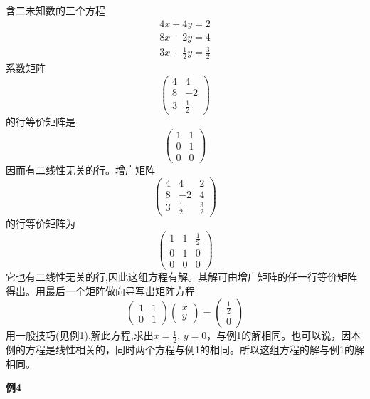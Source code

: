 含二未知数的三个方程
\[
\begin{array}{c}
    4x+4y=2 \\ 8x-2y=4 \\ 3x+\frac{1}{2}y=\frac{3}{2}
\end{array}
\]
系数矩阵
\[
\begin{pmatrix}
    4 & 4 \\
    8 & -2 \\
    3 & \frac{1}{2}
\end{pmatrix}    
\]
的行等价矩阵是
\[
\begin{pmatrix}
    1 & 1 \\
    0 & 1 \\
    0 & 0
\end{pmatrix}    
\]
因而有二线性无关的行。增广矩阵
\[
\begin{pmatrix}
    4 & 4 & 2 \\
    8 & -2 & 4 \\
    3 & \frac{1}{2} & \frac{3}{2}
\end{pmatrix}    
\]
的行等价矩阵为
\[
\begin{pmatrix}
    1 & 1 & \frac{1}{2} \\
    0 & 1 & 0 \\
    0 & 0 & 0
\end{pmatrix}    
\]
它也有二线性无关的行,因此这组方程有解。其解可由增广矩阵的任一行等价矩阵得出。用最后一个矩阵做向导写出矩阵方程
\[
\begin{pmatrix}
    1 & 1 \\
    0 & 1
\end{pmatrix}   
\begin{pmatrix}
    x \\ y
\end{pmatrix}  
=
\begin{pmatrix}
    \frac{1}{2} \\ 0
\end{pmatrix} 
\]
用一般技巧(见例1),解此方程,求出$x=\frac{1}{2}$, $y=0$，与例1的解相同。也可以说，因本例的方程是线性相关的，同时两个方程与例1的相同。所以这组方程的解与例1的解相同。

\textbf{例4}

